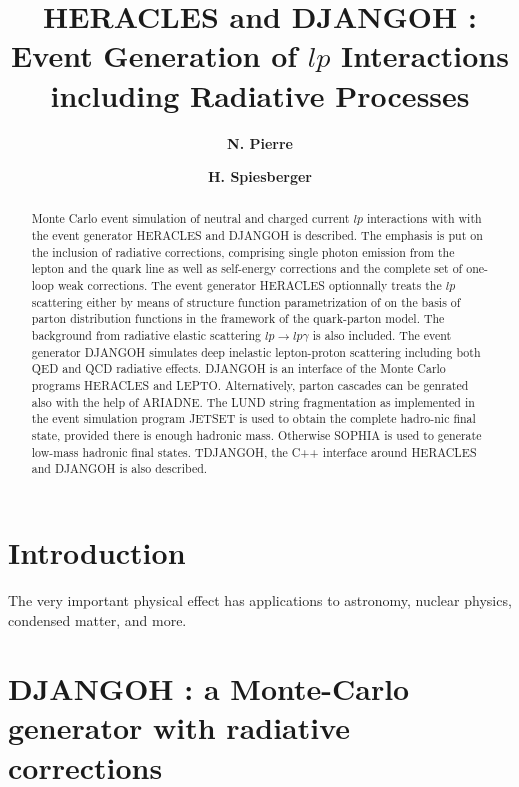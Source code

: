 \documentclass[letterpaper,12pt]{article}
\begin{document}
\title{\textbf{HERACLES and DJANGOH : Event Generation of $lp$ Interactions including Radiative Processes}}
\author[1,2]{\textbf{N. Pierre}}
\author[3]{\textbf{H. Spiesberger}}
\maketitle

\begin{abstract}
  Monte Carlo event simulation of neutral and charged current $lp$ interactions with
  with the event generator HERACLES and DJANGOH is described. The emphasis is put
  on the inclusion of radiative corrections, comprising single photon emission from
  the lepton and the quark line as well as self-energy corrections and the complete
  set of one-loop weak corrections. The event generator HERACLES optionnally treats
  the $lp$ scattering either by means of structure function parametrization of on the
  basis of parton distribution functions in the framework of the quark-parton model.
  The background from radiative elastic scattering $lp \rightarrow lp\gamma$ is also
  included. The event generator DJANGOH simulates deep inelastic lepton-proton
  scattering including both QED and QCD radiative effects. DJANGOH is an interface
  of the Monte Carlo programs HERACLES and LEPTO. Alternatively, parton cascades
  can be genrated also with the help of ARIADNE. The LUND string fragmentation as
  implemented in the event simulation program JETSET is used to obtain the complete
  hadro-nic final state, provided there is enough hadronic mass. Otherwise SOPHIA is
  used to generate low-mass hadronic final states. TDJANGOH, the C++ interface around
  HERACLES and DJANGOH is also described.
\end{abstract}

\newpage

\section{Introduction}

The very important physical effect has applications to astronomy, nuclear physics, condensed matter, and more.



\newpage
\section{DJANGOH : a Monte-Carlo generator with radiative corrections}
\end{document}
